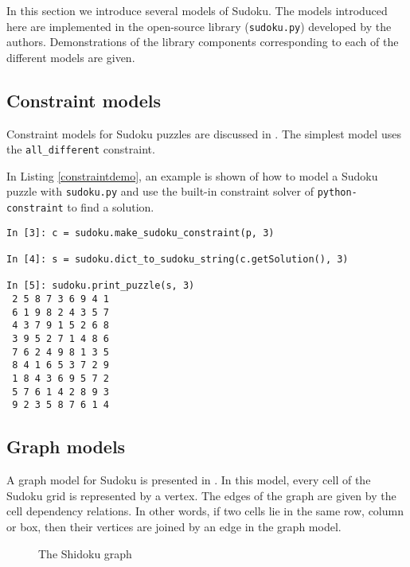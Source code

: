 In this section we introduce several models of Sudoku. The models introduced here are implemented in the open-source library (\texttt{sudoku.py}) developed by the authors. Demonstrations of the library components corresponding to each of the different models are given.

\begin{center}
 \librarytable
\end{center}

\subsection{Constraint models}
\label{sec:models:constraints}

Constraint models for Sudoku puzzles are discussed in \cite{simonissudoku}. The simplest model uses the \texttt{all\_different} constraint.



In Listing \ref{constraintdemo}, an example is shown of how to model a Sudoku puzzle with \texttt{sudoku.py} and use the built-in constraint solver of \texttt{python-constraint} to find a solution.

\begin{lstlisting}[caption=Solving a Sudoku via constraint model,label=constraintdemo]
In [3]: c = sudoku.make_sudoku_constraint(p, 3)

In [4]: s = sudoku.dict_to_sudoku_string(c.getSolution(), 3)

In [5]: sudoku.print_puzzle(s, 3)
 2 5 8 7 3 6 9 4 1 
 6 1 9 8 2 4 3 5 7 
 4 3 7 9 1 5 2 6 8 
 3 9 5 2 7 1 4 8 6 
 7 6 2 4 9 8 1 3 5 
 8 4 1 6 5 3 7 2 9 
 1 8 4 3 6 9 5 7 2 
 5 7 6 1 4 2 8 9 3 
 9 2 3 5 8 7 6 1 4 

\end{lstlisting}

\subsection{Graph models}
\label{sec:models:graph}

A graph model for Sudoku is presented in \cite{gagovargaset}. In this model, every cell of the Sudoku grid is represented by a vertex. The edges of the graph are given by the cell dependency relations. In other words, if two cells lie in the same row, column or box, then their vertices are joined by an edge in the graph model.

\begin{figure}[h]
\centering
\begin{dot2tex}[circo,mathmode,options={--graphstyle "scale=0.40"}]
  
\end{dot2tex}
\caption{The Shidoku graph}
\end{figure}

